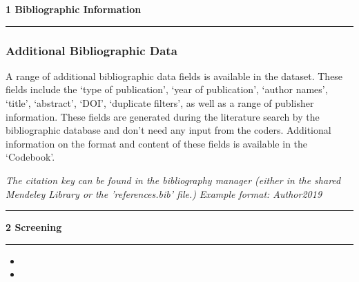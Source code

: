 \documentclass[10pt,a4paper]{protocol}
\newlength{\rulewidth}
\newlength{\ruleandnamegap}
\newcommand{\namefont}{\tiny}
\newcommand{\ruleandname}[2]{%
  \par\noindent
  \rule{#2}{\rulewidth}\par
  \vspace{\dimexpr-\baselineskip+\ruleandnamegap}
  \noindent{\namefont #1}\par
  \addvspace{\baselineskip}
}
\newcommand\category[2]{
{\Large\bfseries\color{emphasis} \vspace{0.25em} #1 \hspace{0.5em} #2 \\ [-0.6em] \rule{\textwidth}{0.4pt} \vspace{0.25em}}
}
\begin{document}
\category{1}{Bibliographic Information}

\begin{topbot}
\subsubsection*{Additional Bibliographic Data}
A range of additional bibliographic data fields is available in the dataset. These fields include the `type of publication', `year of publication', `author names', `title', `abstract', `DOI', `duplicate filters', as well as a range of publisher information. These fields are generated during the literature search by the bibliographic database and don't need any input from the coders. Additional information on the format and content of these fields is available in the `Codebook'.
\end{topbot}

\vspace*{2em}

\textit{The citation key can be found in the bibliography manager (either in the shared Mendeley Library or the 'references.bib' file.)}
\textit{\newline Example format: Author2019}
\vspace{1.5em}
\ruleandname{character string}{5cm}
\divider

\category{2}{Screening}

\vspace{0.5em}
\begin{itemize}
	\item {}
	\item {}
\end{itemize}
\divider
\end{document}
